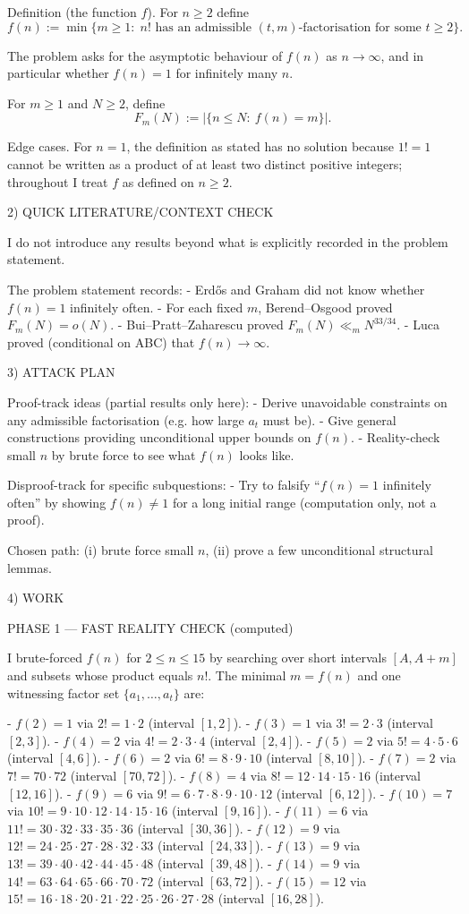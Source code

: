 Definition (the function $f$).
For $n\ge 2$ define
\[
f(n):=\min\{m\ge 1:\; n!\text{ has an admissible }(t,m)\text{-factorisation for some }t\ge 2\}.
\]

The problem asks for the asymptotic behaviour of $f(n)$ as $n\to\infty$, and in particular whether $f(n)=1$ for infinitely many $n$.

For $m\ge 1$ and $N\ge 2$, define
\[
F_m(N):=|\{n\le N:\ f(n)=m\}|.
\]

Edge cases.
For $n=1$, the definition as stated has no solution because $1!=1$ cannot be written as a product of at least two distinct positive integers; throughout I treat $f$ as defined on $n\ge 2$.

2) QUICK LITERATURE/CONTEXT CHECK

I do not introduce any results beyond what is explicitly recorded in the problem statement.

The problem statement records:
- Erd\H{o}s and Graham did not know whether $f(n)=1$ infinitely often.
- For each fixed $m$, Berend--Osgood proved $F_m(N)=o(N)$.
- Bui--Pratt--Zaharescu proved $F_m(N)\ll_m N^{33/34}$.
- Luca proved (conditional on ABC) that $f(n)\to\infty$.

3) ATTACK PLAN

Proof-track ideas (partial results only here):
- Derive unavoidable constraints on any admissible factorisation (e.g. how large $a_t$ must be).
- Give general constructions providing unconditional upper bounds on $f(n)$.
- Reality-check small $n$ by brute force to see what $f(n)$ looks like.

Disproof-track for specific subquestions:
- Try to falsify “$f(n)=1$ infinitely often” by showing $f(n)\neq 1$ for a long initial range (computation only, not a proof).

Chosen path: (i) brute force small $n$, (ii) prove a few unconditional structural lemmas.

4) WORK

PHASE 1 — FAST REALITY CHECK (computed)

I brute-forced $f(n)$ for $2\le n\le 15$ by searching over short intervals $[A,A+m]$ and subsets whose product equals $n!$.
The minimal $m=f(n)$ and one witnessing factor set $\{a_1,\dots,a_t\}$ are:

- $f(2)=1$ via $2!=1\cdot 2$ (interval $[1,2]$).
- $f(3)=1$ via $3!=2\cdot 3$ (interval $[2,3]$).
- $f(4)=2$ via $4!=2\cdot 3\cdot 4$ (interval $[2,4]$).
- $f(5)=2$ via $5!=4\cdot 5\cdot 6$ (interval $[4,6]$).
- $f(6)=2$ via $6!=8\cdot 9\cdot 10$ (interval $[8,10]$).
- $f(7)=2$ via $7!=70\cdot 72$ (interval $[70,72]$).
- $f(8)=4$ via $8!=12\cdot 14\cdot 15\cdot 16$ (interval $[12,16]$).
- $f(9)=6$ via $9!=6\cdot 7\cdot 8\cdot 9\cdot 10\cdot 12$ (interval $[6,12]$).
- $f(10)=7$ via $10!=9\cdot 10\cdot 12\cdot 14\cdot 15\cdot 16$ (interval $[9,16]$).
- $f(11)=6$ via $11!=30\cdot 32\cdot 33\cdot 35\cdot 36$ (interval $[30,36]$).
- $f(12)=9$ via $12!=24\cdot 25\cdot 27\cdot 28\cdot 32\cdot 33$ (interval $[24,33]$).
- $f(13)=9$ via $13!=39\cdot 40\cdot 42\cdot 44\cdot 45\cdot 48$ (interval $[39,48]$).
- $f(14)=9$ via $14!=63\cdot 64\cdot 65\cdot 66\cdot 70\cdot 72$ (interval $[63,72]$).
- $f(15)=12$ via $15!=16\cdot 18\cdot 20\cdot 21\cdot 22\cdot 25\cdot 26\cdot 27\cdot 28$ (interval $[16,28]$).

